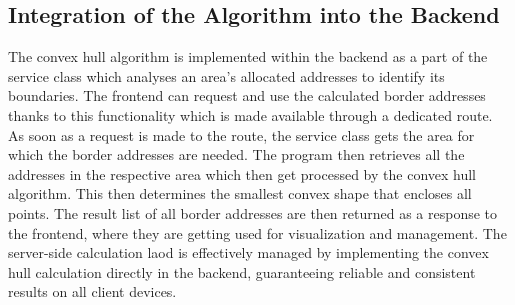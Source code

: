     \subsection{Integration of the Algorithm into the Backend}
    The convex hull algorithm is implemented within the backend as a part of the service class which analyses an area's allocated addresses to identify its boundaries. The frontend can request and use the calculated border addresses thanks to this functionality which is made available through a dedicated route. \newline
    As soon as a request is made to the route, the service class gets the area for which the border addresses are needed. The program then retrieves all the addresses in the respective area which then get processed by the convex hull algorithm. This then determines the smallest convex shape that encloses all points. The result list of all border addresses are then returned as a response to the frontend, where they are getting used for visualization and management. \newline
    The server-side calculation laod is effectively managed by implementing the convex hull calculation directly in the backend, guaranteeing reliable and consistent results on all client devices.

    \newpage